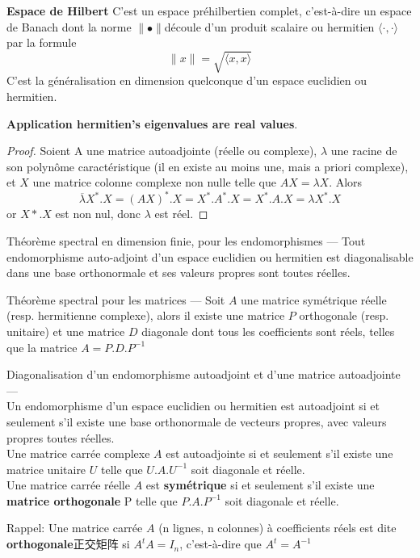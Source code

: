 \documentclass{article}
\begin{document}
\textbf{Espace de Hilbert}
C'est un espace pr\'ehilbertien complet, c'est-\`a-dire un espace de Banach dont la norme $\parallel\bullet\parallel$d\'ecoule d'un produit scalaire ou hermitien $\langle\cdot,\cdot\rangle$ par la formule
 $$\parallel x\parallel = \sqrt{\langle x,x \rangle}$$
C'est la g\'en\'eralisation en dimension quelconque d'un espace euclidien ou hermitien.
\bigskip

\textbf{Application hermitien's eigenvalues are real values}.
\begin{proof}
Soient A une matrice autoadjointe (r\'eelle ou complexe), $\lambda$ une racine de son polyn\^ome caract\'eristique (il en existe au moins une, mais a priori complexe), et $X$ une matrice colonne complexe non nulle telle que
$AX=\lambda X$. Alors
$$ \overline\lambda X^*.X=(AX)^*.X=X^*.A^*.X=X^*.A.X=\lambda X^*.X $$
or $X*.X$ est non nul, donc $\lambda$ est r\'eel.
\end{proof}

\begin{theorem}
Th\'eor\`eme spectral en dimension finie, pour les endomorphismes —  Tout endomorphisme auto-adjoint d'un espace euclidien ou hermitien est diagonalisable dans une base orthonormale et ses valeurs propres sont toutes r\'eelles.

Th\'eor\`eme spectral pour les matrices —  Soit $A$ une matrice sym\'etrique r\'eelle (resp. hermitienne complexe), alors il existe une matrice $P$ orthogonale (resp. unitaire) et une matrice $D$ diagonale dont tous les coefficients sont r\'eels, telles que la matrice $A = P.D.P^{-1}$
\end{theorem}

\begin{theorem}
Diagonalisation d'un endomorphisme autoadjoint et d'une matrice autoadjointe — \\
Un endomorphisme d'un espace euclidien ou hermitien est autoadjoint si et seulement s'il existe une base orthonormale de vecteurs propres, avec valeurs propres toutes r\'eelles.\\
Une matrice carr\'ee complexe $A$ est autoadjointe si et seulement s'il existe une matrice unitaire $U$ telle que $U.A.U^{-1}$ soit diagonale et r\'eelle.\\
Une matrice carr\'ee r\'eelle $A$ est \textbf{sym\'etrique} si et seulement s'il existe une \textbf{matrice orthogonale} P telle que $P.A.P^{-1}$ soit diagonale et r\'eelle.
\end{theorem}
Rappel:
Une matrice carr\'ee $A$ (n lignes, n colonnes) \`a coefficients r\'eels est dite \textbf{orthogonale}正交矩阵 si $A^t A = I_n$, c'est-\`a-dire que $A^t = A^{-1}$
\end{document}
